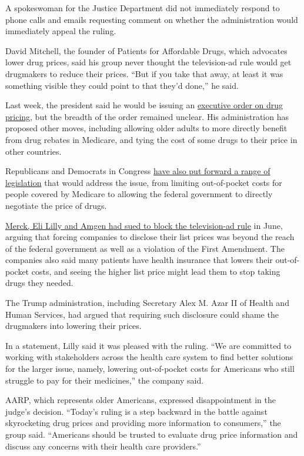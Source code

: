A spokeswoman for the Justice Department did not immediately respond to
phone calls and emails requesting comment on whether the administration
would immediately appeal the ruling.

David Mitchell, the founder of Patients for Affordable Drugs, which
advocates lower drug prices, said his group never thought the
television-ad rule would get drugmakers to reduce their prices. ``But if
you take that away, at least it was something visible they could point
to that they'd done,'' he said.

Last week, the president said he would be issuing an
\href{https://www.nytimes3xbfgragh.onion/2019/07/05/upshot/trump-drug-prices-executive-order.html}{executive
order on drug pricing}, but the breadth of the order remained unclear.
His administration has proposed other moves, including allowing older
adults to more directly benefit from drug rebates in Medicare, and tying
the cost of some drugs to their price in other countries.

Republicans and Democrats in Congress
\href{https://www.nytimes3xbfgragh.onion/2019/06/16/health/drug-prices-congress-trump.html}{have
also put forward a range of legislation} that would address the issue,
from limiting out-of-pocket costs for people covered by Medicare to
allowing the federal government to directly negotiate the price of
drugs.

\href{https://www.nytimes3xbfgragh.onion/2019/06/14/health/drug-prices-tv-ads.html}{Merck,
Eli Lilly and Amgen had sued to block the television-ad rule} in June,
arguing that forcing companies to disclose their list prices was beyond
the reach of the federal government as well as a violation of the First
Amendment. The companies also said many patients have health insurance
that lowers their out-of-pocket costs, and seeing the higher list price
might lead them to stop taking drugs they needed.

The Trump administration, including Secretary Alex M. Azar II of Health
and Human Services, had argued that requiring such disclosure could
shame the drugmakers into lowering their prices.

In a statement, Lilly said it was pleased with the ruling. ``We are
committed to working with stakeholders across the health care system to
find better solutions for the larger issue, namely, lowering
out-of-pocket costs for Americans who still struggle to pay for their
medicines,'' the company said.

AARP, which represents older Americans, expressed disappointment in the
judge's decision. ``Today's ruling is a step backward in the battle
against skyrocketing drug prices and providing more information to
consumers,'' the group said. ``Americans should be trusted to evaluate
drug price information and discuss any concerns with their health care
providers.''

